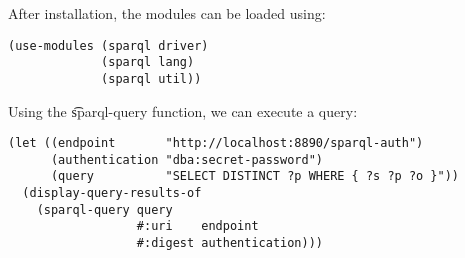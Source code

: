   After installation, the modules can be loaded using:

\begin{siderules}
\begin{verbatim}
(use-modules (sparql driver)
             (sparql lang)
             (sparql util))
\end{verbatim}
\end{siderules}

  Using the \t{sparql-query} function, we can execute a query:

\begin{siderules}
\begin{verbatim}
(let ((endpoint       "http://localhost:8890/sparql-auth")
      (authentication "dba:secret-password")
      (query          "SELECT DISTINCT ?p WHERE { ?s ?p ?o }"))
  (display-query-results-of
    (sparql-query query
                  #:uri    endpoint
                  #:digest authentication)))
\end{verbatim}
\end{siderules}
